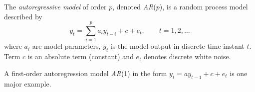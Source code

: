 \documentclass[12pt]{article}
\begin{document}
The {\it autoregressive model} of order $p$, denoted {\it AR}($p$), is a random process model described by
\begin{equation}
  y_{t} = \sum_{i=1}^{p} a_{i} y_{t-i} + c + e_{t}, \qquad t = 1, 2,\ldots
\end{equation}
where $a_i$ are model parameters, $y_{t}$ is the model output in discrete time instant $t$. Term $c$ is an absolute term (constant) and $e_{t}$ denotes discrete white noise.

A first-order autoregression model {\it AR}(1) in the form $y_{t} = a y_{t-1} + c +e _{t}$ is one major example.
\end{document}
